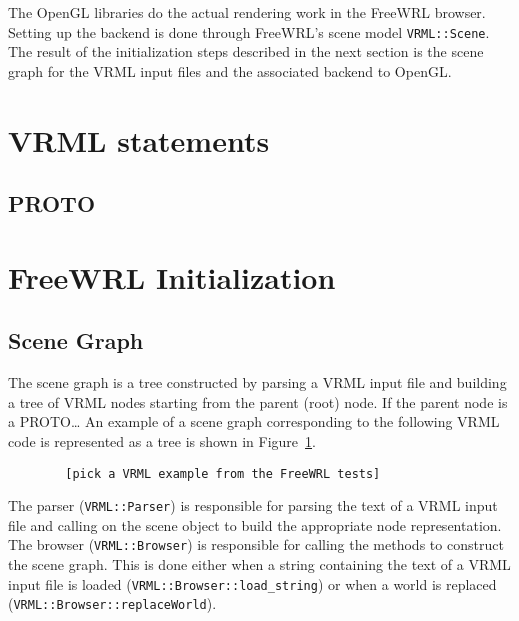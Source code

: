 \documentclass[12pt,letterpaper]{article}
\begin{document}
    The OpenGL libraries do the actual rendering work in the FreeWRL
    browser.
    Setting up the backend is done through FreeWRL's scene model
    \texttt{VRML::Scene}.
    The result of the initialization steps described in the next section
    is the scene graph for the VRML input files and the associated backend
    to OpenGL.

    \section{VRML statements}

	\subsection{PROTO}


    \section{FreeWRL Initialization}

	\subsection{Scene Graph}

	The scene graph is a tree constructed by parsing a VRML input file and
	building a tree of VRML nodes starting from the parent (root) node.
	If the parent node is a PROTO\ldots
	An example of a scene graph corresponding to the following VRML code
	is represented as a tree is shown in Figure~\ref{fig:sg-tree}.

	\begin{verbatim}
	    [pick a VRML example from the FreeWRL tests]
	\end{verbatim}

	\begin{figure}[!ht]
	    \centering
	    \caption{}\label{fig:sg-tree}
	\end{figure}

	The parser (\texttt{VRML::Parser}) is responsible for parsing the text
	of a VRML input file and calling on the scene object to build the
	appropriate node representation.
	The browser (\texttt{VRML::Browser}) is responsible for calling the
	methods to construct the scene graph.
	This is done either when a string containing the text of a VRML input
	file is loaded (\texttt{VRML::Browser::load\_string}) or when a world is
	replaced (\texttt{VRML::Browser::replaceWorld}).
\end{document}
